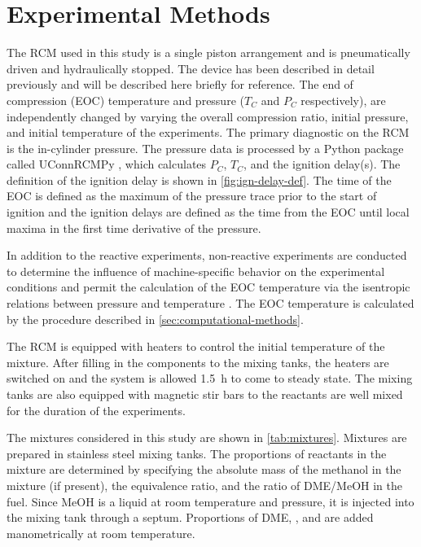 \documentclass[12pt]{../ussci}
\begin{document}
\section{Experimental Methods}\label{sec:experimental-methods}

The RCM used in this study is a single piston arrangement and is pneumatically
driven and hydraulically stopped. The device has been described in detail
previously \autocite{Mittal2007a} and will be described here briefly for
reference. The end of compression (EOC) temperature and pressure (\(T_C\) and
\(P_C\) respectively), are independently changed by varying the overall
compression ratio, initial pressure, and initial temperature of the experiments.
The primary diagnostic on the RCM is the in-cylinder pressure. The pressure data
is processed by a Python package called UConnRCMPy \autocite{uconnrcmpy}, which
calculates \(P_C\), \(T_C\), and the ignition delay(s). The definition of the
ignition delay is shown in \cref{fig:ign-delay-def}. The time of the EOC is
defined as the maximum of the pressure trace prior to the start of ignition and
the ignition delays are defined as the time from the EOC until local maxima in
the first time derivative of the pressure.

In addition to the reactive experiments, non-reactive experiments are conducted
to determine the influence of machine-specific behavior on the experimental
conditions and permit the calculation of the EOC temperature via the isentropic
relations between pressure and temperature \autocite{Lee1998}. The EOC
temperature is calculated by the procedure described in
\cref{sec:computational-methods}.

The RCM is equipped with heaters to control the initial temperature of the
mixture. After filling in the components to the mixing tanks, the heaters are
switched on and the system is allowed \SI{1.5}{\hour} to come to steady state.
The mixing tanks are also equipped with magnetic stir bars to the reactants are
well mixed for the duration of the experiments.

The mixtures considered in this study are shown in \cref{tab:mixtures}. Mixtures
are prepared in stainless steel mixing tanks. The proportions of reactants in
the mixture are determined by specifying the absolute mass of the methanol in
the mixture (if present), the equivalence ratio, and the ratio of DME/MeOH in
the fuel. Since MeOH is a liquid at room temperature and pressure, it is
injected into the mixing tank through a septum. Proportions of DME, , and
 are added manometrically at room temperature.
\end{document}
